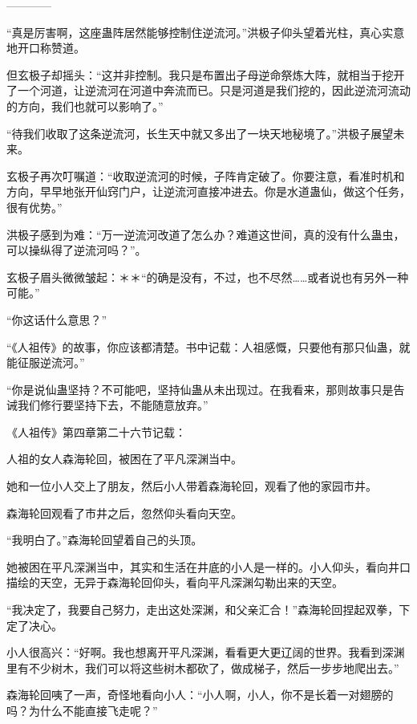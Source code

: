 
\begin{this_body}

------------

“真是厉害啊，这座蛊阵居然能够控制住逆流河。”洪极子仰头望着光柱，真心实意地开口称赞道。

但玄极子却摇头：“这并非控制。我只是布置出子母逆命祭炼大阵，就相当于挖开了一个河道，让逆流河在河道中奔流而已。只是河道是我们挖的，因此逆流河流动的方向，我们也就可以影响了。”

“待我们收取了这条逆流河，长生天中就又多出了一块天地秘境了。”洪极子展望未来。

玄极子再次叮嘱道：“收取逆流河的时候，子阵肯定破了。你要注意，看准时机和方向，早早地张开仙窍门户，让逆流河直接冲进去。你是水道蛊仙，做这个任务，很有优势。”

洪极子感到为难：“万一逆流河改道了怎么办？难道这世间，真的没有什么蛊虫，可以操纵得了逆流河吗？”。

玄极子眉头微微皱起：＊＊“的确是没有，不过，也不尽然……或者说也有另外一种可能。”

“你这话什么意思？”

“《人祖传》的故事，你应该都清楚。书中记载：人祖感慨，只要他有那只仙蛊，就能征服逆流河。”

“你是说仙蛊坚持？不可能吧，坚持仙蛊从未出现过。在我看来，那则故事只是告诫我们修行要坚持下去，不能随意放弃。”

《人祖传》第四章第二十六节记载：

人祖的女人森海轮回，被困在了平凡深渊当中。

她和一位小人交上了朋友，然后小人带着森海轮回，观看了他的家园市井。

森海轮回观看了市井之后，忽然仰头看向天空。

“我明白了。”森海轮回望着自己的头顶。

她被困在平凡深渊当中，其实和生活在井底的小人是一样的。小人仰头，看向井口描绘的天空，无异于森海轮回仰头，看向平凡深渊勾勒出来的天空。

“我决定了，我要自己努力，走出这处深渊，和父亲汇合！”森海轮回捏起双拳，下定了决心。

小人很高兴：“好啊。我也想离开平凡深渊，看看更大更辽阔的世界。我看到深渊里有不少树木，我们可以将这些树木都砍了，做成梯子，然后一步步地爬出去。”

森海轮回咦了一声，奇怪地看向小人：“小人啊，小人，你不是长着一对翅膀的吗？为什么不能直接飞走呢？”


\end{this_body}
